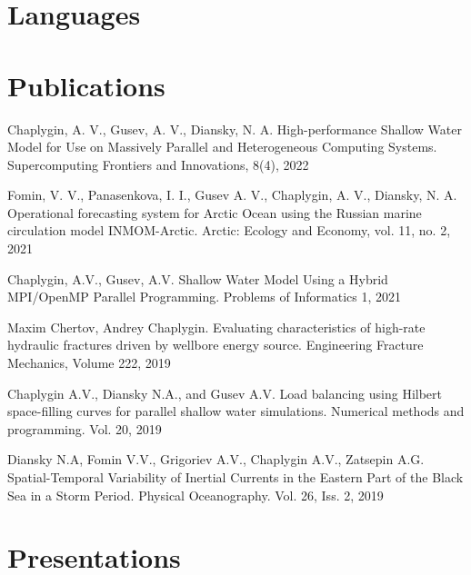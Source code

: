 \documentclass[10pt,a4paper]{moderncv}
\begin{document}
\clearpage

\section{Languages}

\section{Publications}

\cvline{}
{Chaplygin, A. V., Gusev, A. V., Diansky, N. A. High-performance Shallow Water Model for Use on Massively Parallel and Heterogeneous Computing Systems. Supercomputing Frontiers and Innovations, 8(4), 2022}

\cvline{}
{Fomin, V. V., Panasenkova, I. I., Gusev A. V., Chaplygin, A. V., Diansky, N. A. Operational forecasting system for Arctic Ocean using the Russian marine circulation model INMOM-Arctic. Arctic: Ecology and Economy, vol. 11, no. 2, 2021}

\cvline{}
{Chaplygin, A.V., Gusev, A.V. Shallow Water Model Using a Hybrid MPI/OpenMP Parallel Programming. Problems of Informatics 1, 2021}

\cvline{}
{Maxim Chertov, Andrey Chaplygin. Evaluating characteristics of high-rate hydraulic fractures driven by wellbore energy source. Engineering Fracture Mechanics, Volume 222, 2019}

\cvline{}
{Chaplygin A.V., Diansky N.A., and Gusev A.V. Load balancing using Hilbert space-filling curves for parallel shallow water simulations. Numerical methods and programming. Vol. 20, 2019}

\cvline{}
{Diansky N.A, Fomin V.V., Grigoriev A.V., Chaplygin A.V., Zatsepin A.G. Spatial-Temporal Variability of Inertial Currents in the Eastern Part of the Black Sea in a Storm Period. Physical Oceanography. Vol. 26, Iss. 2, 2019}

\section{Presentations}


\end{document}
